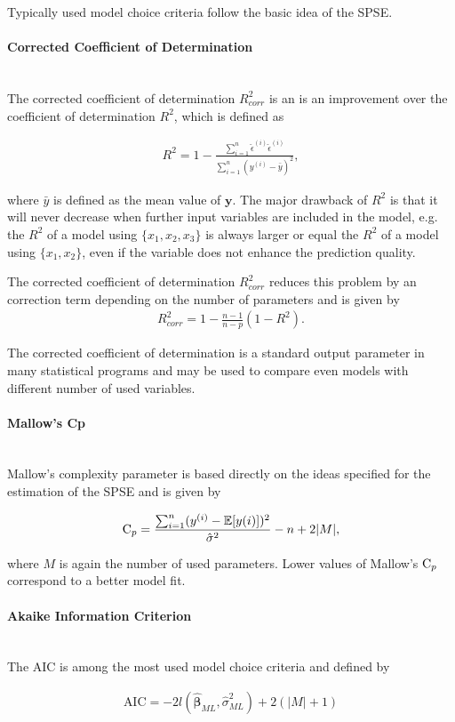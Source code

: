 \documentclass[10pt,a4paper]{article}
\newcommand{\subsubsubsection}[1]{\paragraph{#1}\mbox{}\\}
\begin{document}
Typically used model choice criteria follow the basic idea of the SPSE. \cite{fahrmeir2013regression}

\subsubsubsection{Corrected Coefficient of Determination}

The corrected coefficient of determination $R^2_{corr}$ is an is an improvement over the coefficient of determination $R^2$, which is defined as 

\begin{align}
	R^2 = 1 - \frac{\sum_{i=1}^n \hat \epsilon^{(i)} \hat \epsilon^{(i)}}{\sum_{i=1}^n (y^{(i)} - \bar y)^2},
\end{align}

where $\bar y$ is defined as the mean value of $\boldsymbol{y}$. The major drawback of $R^2$ is that it will never decrease when further input variables are included in the model, e.g. the $R^2$ of a model using $\{x_1, x_2, x_3\}$ is always larger or equal the $R^2$ of a model using $\{x_1, x_2\}$, even if the variable does not enhance the prediction quality. 

The corrected coefficient of determination $R_{corr}^2$ reduces this problem by an correction term depending on the  number of parameters and is given by
\begin{align}
	R_{corr}^2 = 1 - \frac{n-1}{n-p}(1-R^2).
\end{align}

The corrected coefficient of determination is a standard output parameter in many statistical programs and may be used to compare even models with different number of used variables. \cite{fahrmeir2013regression}

\subsubsubsection{Mallow's Cp}

Mallow's complexity parameter is based directly on the ideas specified for the estimation of the SPSE and is given by

\begin{align}
	\text C_p = \frac{\sum_{i=1}^n (y^{(i)} - \mathbb{E}[y{(i)}])^2}{\hat \sigma^2} - n + 2 \vert M \vert,
\end{align}

where $M$ is again the number of used parameters. Lower values of Mallow's $\text C_p$ correspond to a better model fit. \cite{fahrmeir2013regression}

\subsubsubsection{Akaike Information Criterion}

The AIC is among the most used model choice criteria and defined by

\begin{align}
	\text{AIC} = -2 l(\boldsymbol{\hat{\beta}}_{ML}, \hat \sigma^2_{ML}) + 2(\vert M \vert +1)
\end{align}
\end{document}
